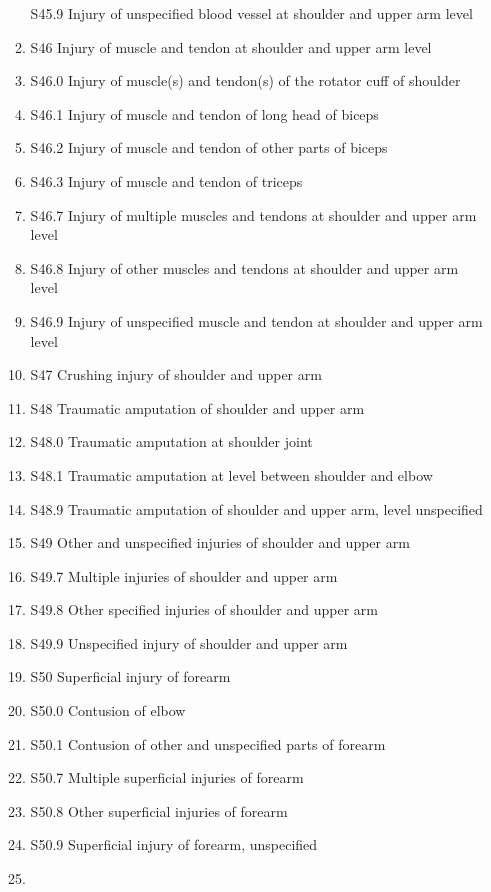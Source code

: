 \documentclass[
]{scrartcl}
\begin{document}
\begin{itemize}
\begin{enumerate}
    S45.9 Injury of unspecified blood vessel at shoulder and upper arm
    level
  \item
    S46 Injury of muscle and tendon at shoulder and upper arm level
  \item
    S46.0 Injury of muscle(s) and tendon(s) of the rotator cuff of
    shoulder
  \item
    S46.1 Injury of muscle and tendon of long head of biceps
  \item
    S46.2 Injury of muscle and tendon of other parts of biceps
  \item
    S46.3 Injury of muscle and tendon of triceps
  \item
    S46.7 Injury of multiple muscles and tendons at shoulder and upper
    arm level
  \item
    S46.8 Injury of other muscles and tendons at shoulder and upper arm
    level
  \item
    S46.9 Injury of unspecified muscle and tendon at shoulder and upper
    arm level
  \item
    S47 Crushing injury of shoulder and upper arm
  \item
    S48 Traumatic amputation of shoulder and upper arm
  \item
    S48.0 Traumatic amputation at shoulder joint
  \item
    S48.1 Traumatic amputation at level between shoulder and elbow
  \item
    S48.9 Traumatic amputation of shoulder and upper arm, level
    unspecified
  \item
    S49 Other and unspecified injuries of shoulder and upper arm
  \item
    S49.7 Multiple injuries of shoulder and upper arm
  \item
    S49.8 Other specified injuries of shoulder and upper arm
  \item
    S49.9 Unspecified injury of shoulder and upper arm
  \item
    S50 Superficial injury of forearm
  \item
    S50.0 Contusion of elbow
  \item
    S50.1 Contusion of other and unspecified parts of forearm
  \item
    S50.7 Multiple superficial injuries of forearm
  \item
    S50.8 Other superficial injuries of forearm
  \item
    S50.9 Superficial injury of forearm, unspecified
  \item

\end{enumerate}
\end{itemize}
\end{document}
